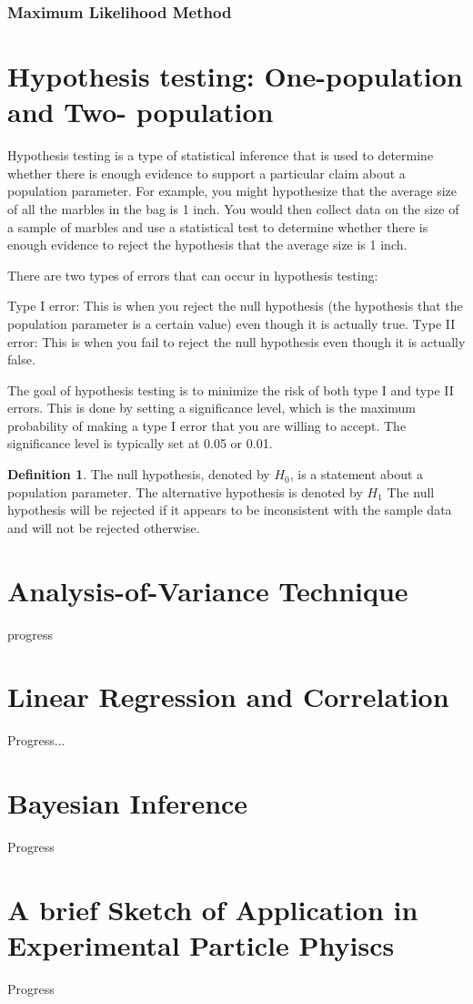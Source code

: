 \documentclass[12pt,a4paper]{article}
\theoremstyle{example}
\theoremstyle{definition}
\newtheorem{definition}{Definition}
\theoremstyle{theorem}
\begin{document}
\subsubsection{Maximum Likelihood Method}
\section{Hypothesis testing: One-population and Two- population}
Hypothesis testing is a type of statistical inference that is used to determine whether there is enough evidence to support a particular claim about a population parameter. For example, you might hypothesize that the average size of all the marbles in the bag is 1 inch. You would then collect data on the size of a sample of marbles and use a statistical test to determine whether there is enough evidence to reject the hypothesis that the average size is 1 inch.

There are two types of errors that can occur in hypothesis testing:

    Type I error: This is when you reject the null hypothesis (the hypothesis that the population parameter is a certain value) even though it is actually true.
    Type II error: This is when you fail to reject the null hypothesis even though it is actually false.

The goal of hypothesis testing is to minimize the risk of both type I and type II errors. This is done by setting a significance level, which is the maximum probability of making a type I error that you are willing to accept. The significance level is typically set at 0.05 or 0.01.
\begin{definition}
    The null hypothesis, denoted by $H_0$, is a statement about a population parameter. The alternative
hypothesis is denoted by $H_1$ The null hypothesis will be rejected if it appears to be inconsistent
with the sample data and will not be rejected otherwise.
\end{definition}
\section{Analysis-of-Variance Technique}
progress
\section{ Linear Regression and Correlation}
Progress...
\section{Bayesian Inference}
Progress


\section{A brief Sketch of Application in Experimental Particle Phyiscs}
Progress


\end{document}
